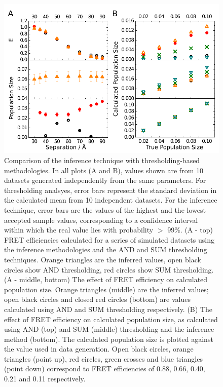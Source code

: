 \begin{figure}
   \begin{center}
      \includegraphics*[width=5in]{inference/fig4_synthetic.pdf}
      \caption{Comparison of the inference technique with thresholding-based methodologies.  In all plots (A and B), values shown are from 10 datasets generated independently from the same parameters. For thresholding analsyes, error bars represent the standard deviation in the calculated mean from 10 independent datasets.  For the inference technique, error bars are the values of the highest and the lowest accepted sample values, corresponding to a confidence interval within which the real value lies with probability $>$ 99\%. (A - top) FRET efficiencies calculated for a series of simulated datasets using the inference methodologies and the AND and SUM thresholding techniques. Orange triangles are the inferred values, open black circles show AND thresholding, red circles show SUM thresholding. (A - middle, bottom) The effect of FRET efficiency on calculated population size. Orange triangles (middle) are the inferred values; open black circles and closed red circles (bottom) are values calculated using AND and SUM thresholding respectively. (B) The effect of FRET efficiency on calculated population size, as calculated using AND (top) and SUM (middle) thresholding and the inference method (bottom).  The calculated population size is plotted against the value used in data generation.  Open black circles, orange triangles (point up), red circles, green crosses and blue triangles (point down) correspond to FRET efficiencies of 0.88, 0.66, 0.40, 0.21 and 0.11 respectively.}
      \label{fig:fig4_synthetic_AndSumInfer}
   \end{center}
\end{figure} 

